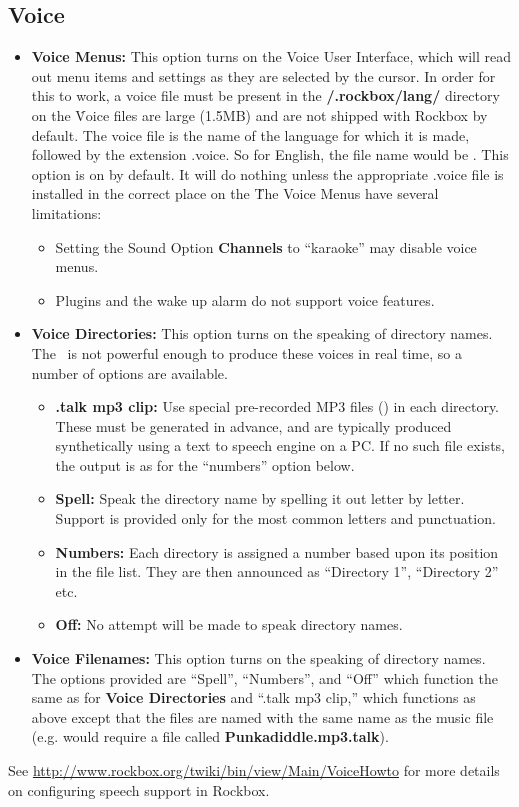   \subsection{\label{ref:Voiceconfiguration}Voice}
  
  \begin{itemize}
  \item \textbf{Voice Menus:}
    This option turns on the Voice User Interface, which will read out menu items and settings as they are selected by the cursor.  In order for this to work, a voice file must be present in the \textbf{/.rockbox/lang/} directory on the \dap\.  Voice files are large (1.5MB) and are not shipped with Rockbox by default.
    The voice file is the name of the language for which it is made, followed by the extension .voice.  So for English, the file name would be .
    This option is on by default.  It will do nothing unless the appropriate .voice file is installed in the correct place on the \dap\.
 		The Voice Menus have several limitations:
 		\begin{itemize}
    \item Setting the Sound Option \textbf{Channels} to ``karaoke'' may disable voice menus.
    \item Plugins and the wake up alarm do not support voice features.
    \end{itemize}
  
  \item \textbf{Voice Directories:}
    This option turns on the speaking of directory names.  The \dap\ is not powerful enough to produce these voices in real time, so a number of options are available.
    \begin{itemize}
    \item \textbf{.talk mp3 clip: }
      Use special pre{}-recorded MP3 files () in each directory.  These must be generated in advance, and are typically produced synthetically using a text to speech engine on a PC.  If no such file exists, the output is as for the ``numbers'' option below.
    \item \textbf{Spell: }
      Speak the directory name by spelling it out letter by letter.  Support is provided only for the most common letters and punctuation.
    \item \textbf{Numbers: }
      Each directory is assigned a number based upon its position in the file list.  They are then announced as ``Directory 1'', ``Directory 2'' etc.
    \item \textbf{Off: }
      No attempt will be made to speak directory names.
    \end{itemize}
    
  \item \textbf{Voice Filenames:}
    This option turns on the speaking of directory names.  The options provided are ``Spell'', ``Numbers'', and ``Off'' which function the same as for \textbf{Voice Directories} and ``.talk mp3 clip,'' which functions as above except that the files are named with the same name as the music file (e.g.  would require a file called \textbf{Punkadiddle.mp3.talk}).
    
	\end{itemize}

See \url{http://www.rockbox.org/twiki/bin/view/Main/VoiceHowto} for more details on configuring speech support in Rockbox.
